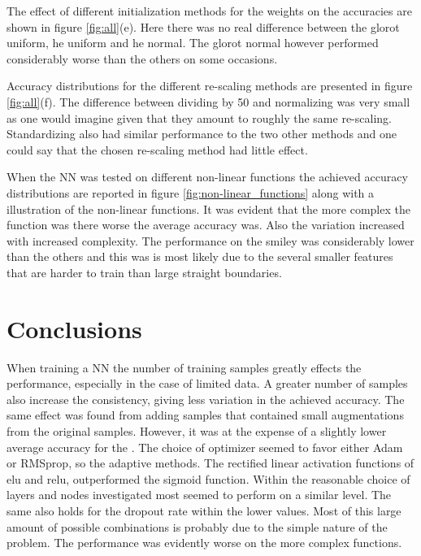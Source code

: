 \documentclass[prl,twocolumn]{revtex4-1}
\begin{document}
The effect of different initialization methods for the weights on the accuracies are shown in figure \ref{fig:all}(e). Here there was no real difference between the glorot uniform, he uniform and he normal. The glorot normal however performed considerably worse than the others on some occasions.

Accuracy distributions for the different re-scaling methods are presented in figure \ref{fig:all}(f). The difference between dividing by 50 and normalizing was very small as one would imagine given that they amount to roughly the same re-scaling. Standardizing also had similar performance to the two other methods and one could say that the chosen re-scaling method had little effect. 


When the NN was tested on different non-linear functions the achieved accuracy distributions are reported in figure \ref{fig:non-linear_functions} along with a illustration of the non-linear functions. It was evident that the more complex the function was there worse the average accuracy was. Also the variation increased with increased complexity. The performance on the smiley was considerably lower than the others and this was is most likely due to the several smaller features that are harder to train than large straight boundaries. 



\section{Conclusions}

When training a NN the number of training samples greatly effects the performance, especially in the case of limited data. A greater number of samples also increase the consistency, giving less variation in the achieved accuracy. The same effect was found from adding samples that contained small augmentations from the original samples. However, it was at the expense of a slightly lower average accuracy for the . The choice of optimizer seemed to favor either Adam or RMSprop, so the adaptive methods. The rectified linear activation functions of elu and relu, outperformed the sigmoid function. Within the reasonable choice of layers and nodes investigated most seemed to perform on a similar level. The same also holds for the dropout rate within the lower values. Most of this large amount of possible combinations is probably due to the simple nature of the problem. The performance was evidently worse on the more complex functions.
\end{document}
